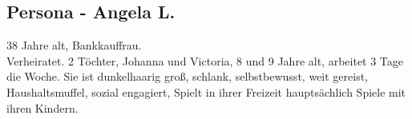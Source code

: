 \subsection{Persona - Angela L.} 
38 Jahre alt, Bankkauffrau. \\
Verheiratet. 2 Töchter, Johanna und Victoria, 8 und 9 Jahre alt, arbeitet 3 Tage die Woche. 
Sie ist dunkelhaarig groß, schlank, selbstbewusst, weit gereist, Haushaltsmuffel, sozial engagiert,
Spielt in ihrer Freizeit hauptsächlich Spiele mit ihren Kindern.



